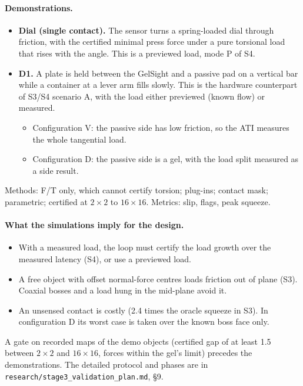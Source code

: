 \documentclass[11pt,a4paper]{article}
\newcommand{\code}[1]{\texttt{#1}}
\begin{document}
\paragraph{Demonstrations.}
\begin{itemize}
    \item \textbf{Dial (single contact).} The sensor turns a spring-loaded dial through friction, with the certified minimal press force under a pure
    torsional load that rises with the angle. This is a previewed load, mode P of S4.
    \item \textbf{D1.} A plate is held between the GelSight and a passive pad on a vertical bar while a container at a lever arm fills slowly. This is the
    hardware counterpart of S3/S4 scenario A, with the load either previewed (known flow) or measured.
    \begin{itemize}
        \item Configuration V: the passive side has low friction, so the ATI measures the whole tangential load.
        \item Configuration D: the passive side is a gel, with the load split measured as a side result.
    \end{itemize}
\end{itemize}
Methods: F/T only, which cannot certify torsion; plug-ins; contact mask; parametric; certified at $2\times2$ to $16\times16$. Metrics: slip, flags, peak
squeeze.
\paragraph{What the simulations imply for the design.}
\begin{itemize}
    \item With a measured load, the loop must certify the load growth over the measured latency (S4), or use a previewed load.
    \item A free object with offset normal-force centres loads friction out of plane (S3). Coaxial bosses and a load hung in the mid-plane avoid it.
    \item An unsensed contact is costly (2.4 times the oracle squeeze in S3). In configuration D its worst case is taken over the known boss face only.
\end{itemize}
A gate on recorded maps of the demo objects (certified gap of at least 1.5 between $2\times2$ and $16\times16$, forces within the gel's limit) precedes
the demonstrations. The detailed protocol and phases are in \code{research/stage3\_validation\_plan.md}, §9.
\end{document}

